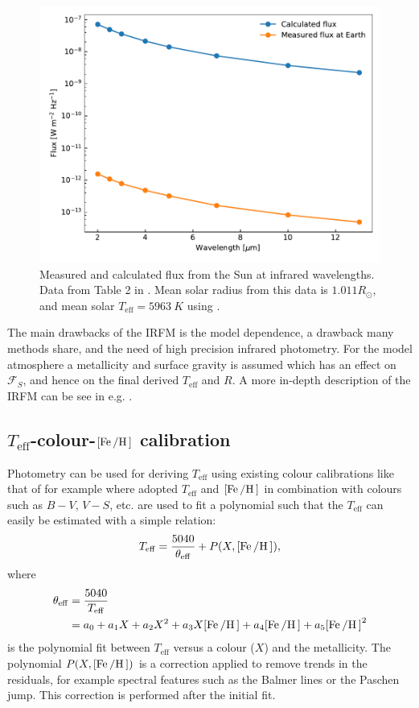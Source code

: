 \begin{figure}[htpb!]
    \centering
    \includegraphics[width=0.85\linewidth]{figures/IRFM.pdf}
    \caption{Measured and calculated flux from the Sun at infrared wavelengths.
             Data from Table 2 in \citet{Blackwell1977}. Mean solar radius from
             this data is $1.011R_\odot$, and mean solar
             $T_\mathrm{eff}=\SI{5963}{K}$ using .}
    \label{fig:IRFM}
\end{figure}

The main drawbacks of the IRFM is the model dependence, a drawback many methods
share, and the need of high precision infrared photometry. For the model
atmosphere a metallicity and surface gravity is assumed which has an effect on
$\mathcal{F}_S$, and hence on the final derived $T_\mathrm{eff}$ and $R$. A more
in-depth description of the IRFM can be see in e.g.
\citet[][section 4]{Casagrande2006}.


\subsection{$T_\mathrm{eff}$-colour-$[\ion{Fe}/\ion{H}]$ calibration}

Photometry can be used for deriving $T_\mathrm{eff}$ using existing colour
calibrations like that of for example \citet{Ramirez2005a} where adopted
$T_\mathrm{eff}$ and $[\ion{Fe}/\ion{H}]$ in combination with colours such as
$B-V$, $V-S$, etc. are used to fit a polynomial such that the $T_\mathrm{eff}$
can easily be estimated with a simple relation:
\begin{align}
  T_\mathrm{eff} = \frac{5040}{\theta_\mathrm{eff}} + P(X, [\ion{Fe}/\ion{H}]),
\end{align}
where
\begin{align}
  \theta_\mathrm{eff} &= \frac{5040}{T_\mathrm{eff}} \\
                      &= a_0+a_1 X+a_2 X^2+a_3X[\ion{Fe}/\ion{H}] + a_4[\ion{Fe}/\ion{H}] + a_5[\ion{Fe}/\ion{H}]^2
\end{align}
is the polynomial fit between $T_\mathrm{eff}$ versus a colour ($X$) and the
metallicity. The polynomial $P(X, [\ion{Fe}/\ion{H}])$ is a correction applied
to remove trends in the residuals, for example spectral features such as the
Balmer lines or the Paschen jump. This correction is performed after the initial
fit.

